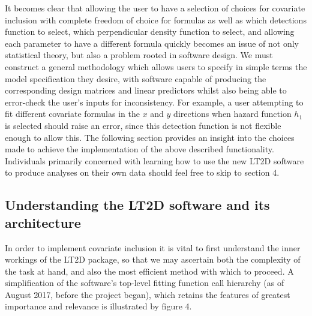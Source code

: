 \documentclass[11pt]{article}
\begin{document}
\begin{multicols}{2}
It becomes clear that allowing the user to have a selection of choices for covariate inclusion with complete freedom of choice for formulas as well as which detections function to select, which perpendicular density function to select, and allowing each parameter to have a different formula quickly becomes an issue of not only statistical theory, but also a problem rooted in software design. We must construct a general methodology which allows users to specify in simple terms the model specification they desire, with software capable of producing the corresponding design matrices and linear predictors whilst also being able to error-check the user's inputs for inconsistency. For example, a user attempting to fit different covariate formulas in the $x$ and $y$ directions when hazard function $h_1$ is selected should raise an error, since this detection function is not flexible enough to allow this. The following section provides an insight into the choices made to achieve the implementation of the above described functionality. Individuals primarily concerned with learning how to use the new LT2D software to produce analyses on their own data should feel free to skip to section 4.

\subsection{Understanding the LT2D software and its architecture}
In order to implement covariate inclusion it is vital to first understand the inner workings of the LT2D package, so that we may ascertain both the complexity of the task at hand, and also the most efficient method with which to proceed. A simplification of the software's top-level fitting function call hierarchy (as of August 2017, before the project began), which retains the features of greatest importance and relevance is illustrated by figure 4.


\end{multicols}
\end{document}
